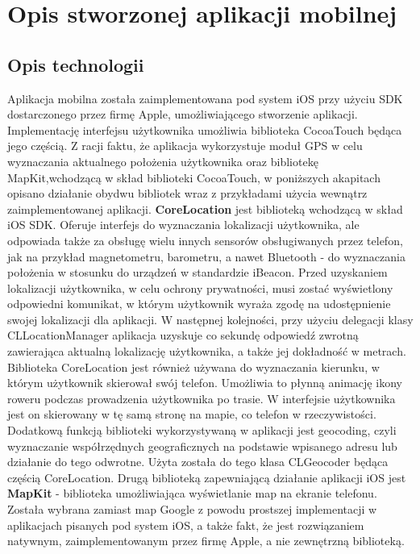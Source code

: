 \section{Opis stworzonej aplikacji mobilnej}

\subsection{Opis technologii}

Aplikacja mobilna została zaimplementowana pod system iOS przy użyciu SDK dostarczonego przez firmę Apple, umożliwiającego stworzenie aplikacji. Implementację interfejsu użytkownika umożliwia biblioteka CocoaTouch będąca jego częścią. Z racji faktu, że aplikacja wykorzystuje moduł GPS w celu wyznaczania aktualnego położenia użytkownika oraz bibliotekę MapKit,wchodzącą w skład biblioteki CocoaTouch, w poniższych akapitach opisano działanie obydwu bibliotek wraz z przykładami użycia wewnątrz zaimplementowanej aplikacji. \newline
\textbf{CoreLocation} jest biblioteką wchodzącą w skład iOS SDK. Oferuje interfejs do wyznaczania lokalizacji użytkownika, ale odpowiada także za obsługę wielu innych sensorów obsługiwanych przez telefon, jak na przykład magnetometru, barometru, a nawet Bluetooth - do wyznaczania położenia w stosunku do urządzeń w standardzie iBeacon. Przed uzyskaniem lokalizacji użytkownika, w celu ochrony prywatności, musi zostać wyświetlony odpowiedni komunikat, w którym użytkownik wyraża zgodę na udostępnienie swojej lokalizacji dla aplikacji. W następnej kolejności, przy użyciu delegacji klasy CLLocationManager aplikacja uzyskuje co sekundę odpowiedź zwrotną zawierająca aktualną lokalizację użytkownika, a także jej dokładność w metrach. Biblioteka CoreLocation jest również używana do wyznaczania kierunku, w którym użytkownik skierował swój telefon. Umożliwia to płynną animację ikony roweru podczas prowadzenia użytkownika po trasie. W interfejsie użytkownika jest on skierowany w tę samą stronę na mapie, co telefon w rzeczywistości. Dodatkową funkcją biblioteki wykorzystywaną w aplikacji jest geocoding, czyli wyznaczanie współrzędnych geograficznych na podstawie wpisanego adresu lub działanie do tego odwrotne. Użyta została do tego klasa CLGeocoder będąca częścią CoreLocation. \newline
Drugą biblioteką zapewniającą działanie aplikacji iOS jest \textbf{MapKit} - biblioteka umożliwiająca wyświetlanie map na ekranie telefonu. Została wybrana zamiast map Google z powodu prostszej implementacji w aplikacjach pisanych pod system iOS, a także fakt, że jest rozwiązaniem natywnym, zaimplementowanym przez firmę Apple, a nie zewnętrzną biblioteką.


